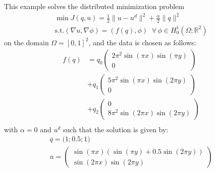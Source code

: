 This example solves the distributed minimization problem
\begin{gather*}
\min J(q,u) = \frac{1}{2} \|u-u^d\|^2 + \frac{\alpha}{2}\|q\|^2\\
\text{s.t.} (\nabla u,\nabla \phi) = (f(q),\phi)\;\;\forall\,\phi \in H^1_0(\Omega; \mathbb R^2)
\end{gather*}
on the domain $\Omega = [0,1]^2$, and the data is chosen as follows:
\begin{align*}
 f(q) &= q_0 \left(\begin{matrix}2\pi^2  \sin( \pi x) \sin(\pi y)\\0 \end{matrix}\right)\\
      &+ q_1 \left(\begin{matrix}5\pi^2  \sin( \pi x) \sin(2\pi y)\\0 \end{matrix}\right)\\
      &+ q_2 \left(\begin{matrix}0 \\8\pi^2  \sin(2\pi x) \sin(2\pi y)\end{matrix}\right)\\
\end{align*}
with $\alpha = 0$ and $u^d$ such that the solution is given by:
\begin{gather*}
 \overline{q} = \bigl(1;0.5;1\bigr)\\
 \overline{u} = \left(\begin{matrix} \sin( \pi x)( \sin(\pi y)+0.5\sin(2\pi y))\\\sin(2\pi x) \sin(2\pi y) \end{matrix}\right)
\end{gather*}
